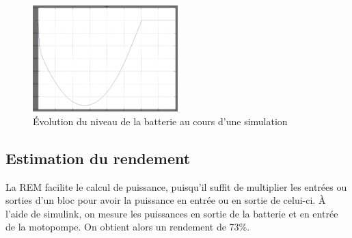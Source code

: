 \begin{figure}[ht]
	\begin{center}
	\includegraphics[width=0.5\textwidth]{images/Niveau_batt_inv.png}
	\caption{Évolution du niveau de la batterie au cours d'une simulation}\label{img:NivBatt}
	\end{center}
\end{figure}
\FloatBarrier 


\subsection{Estimation du rendement}
La REM facilite le calcul de puissance, puisqu'il suffit de multiplier les entrées ou sorties d'un bloc pour avoir la puissance en entrée ou en  sortie de celui-ci. À l'aide de simulink, on mesure les puissances en sortie de la batterie et en entrée de la motopompe. On obtient alors un rendement de 73\%.



